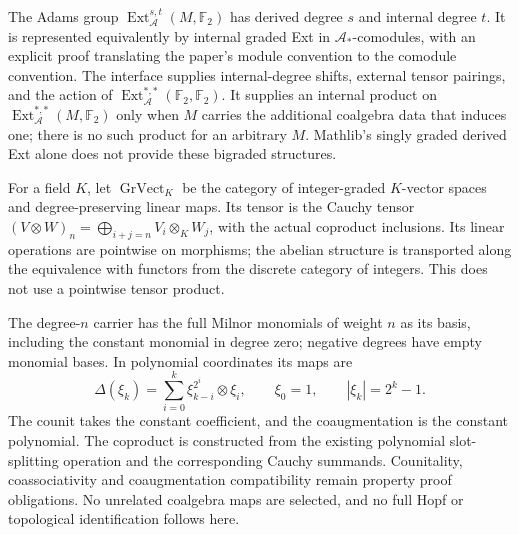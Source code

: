 \begin{definition}
  \label{def:adams-bigraded-ext}
  \notready
  The Adams group $\operatorname{Ext}_{\mathcal A}^{s,t}(M,\mathbb F_2)$ has
  derived degree $s$ and internal degree $t$.  It is represented equivalently
  by internal graded Ext in $\mathcal A_*$-comodules, with an explicit proof
  translating the paper's module convention to the comodule convention.  The
  interface supplies internal-degree shifts, external tensor pairings, and the
  action of
  $\operatorname{Ext}_{\mathcal A}^{*,*}(\mathbb F_2,\mathbb F_2)$.
  It supplies an internal product on
  $\operatorname{Ext}_{\mathcal A}^{*,*}(M,\mathbb F_2)$ only when $M$ carries
  the additional coalgebra data that induces one; there is no such product for
  an arbitrary $M$.  Mathlib's singly graded derived Ext alone does not provide
  these bigraded structures.
\end{definition}

\begin{definition}
  \label{def:graded-vector-space-cauchy}
  \leanok
  For a field $K$, let $\operatorname{GrVect}_K$ be the category of
  integer-graded $K$-vector spaces and degree-preserving linear maps.
  Its tensor is the Cauchy tensor
  $(V\otimes W)_n=\bigoplus_{i+j=n}V_i\otimes_K W_j$, with the actual
  coproduct inclusions. Its linear operations are pointwise on morphisms;
  the abelian structure is transported along the equivalence with functors
  from the discrete category of integers. This does not use a pointwise
  tensor product.
\end{definition}

\begin{definition}
  \label{def:fixed-milnor-graded-coalgebra}
  The degree-$n$ carrier has the full Milnor monomials of weight $n$ as
  its basis, including the constant monomial in degree zero; negative
  degrees have empty monomial bases. In polynomial coordinates its maps are
  \[
    \Delta(\xi_k)=\sum_{i=0}^{k}\xi_{k-i}^{2^i}\otimes\xi_i,
    \qquad \xi_0=1,\qquad |\xi_k|=2^k-1.
  \]
  The counit takes the constant coefficient, and the coaugmentation is
  the constant polynomial. The coproduct is constructed from the existing
  polynomial slot-splitting operation and the corresponding Cauchy
  summands. Counitality, coassociativity and coaugmentation compatibility
  remain property proof obligations. No unrelated coalgebra maps are
  selected, and no full Hopf or topological identification follows here.
\end{definition}

